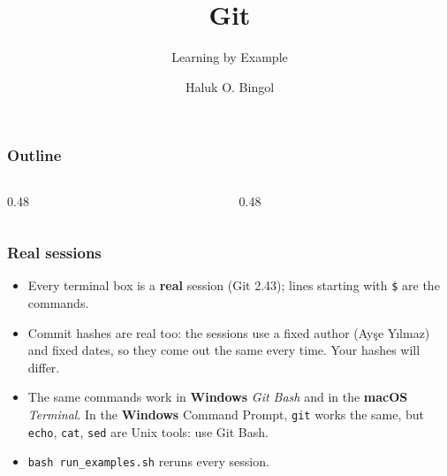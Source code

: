 \documentclass[aspectratio=169,10pt,compress]{beamer}
\title{Git}
\subtitle{Learning by Example}
\author[Bingol]{Haluk O. Bingol}
\institute[FCIS]{
    Faculty of Computer and Information Sciences\\
    Yeditepe University
}
\date{
	{\tiny \hbTimeStamp}
}
\newcommand{\win}{\textbf{Windows}}
\newcommand{\mac}{\textbf{macOS}}
\begin{document}
\begin{frame}[t,fragile]
  \titlepage
\end{frame}




\begin{frame}[t,fragile] \frametitle{Outline}
  \begin{columns}[T]
    \begin{column}{0.48\textwidth}
      \tableofcontents[sections={1-4}, hideallsubsections]
    \end{column}
    \begin{column}{0.48\textwidth}
      \tableofcontents[sections={5-8}, hideallsubsections]
    \end{column}
  \end{columns}
\end{frame}





\begin{frame}[t,fragile] \frametitle{Real sessions}
  \begin{itemize}
    \item Every terminal box is a \textbf{real} session (Git 2.43); lines starting with \texttt{\$} are the commands.
    \item Commit hashes are real too: the sessions use a fixed author (Ayşe Yılmaz) and fixed dates, so they come out the same every time.
          Your hashes will differ.
    \item The same commands work in \win{} \emph{Git Bash} and in the \mac{} \emph{Terminal}. In the \win{} Command Prompt, \texttt{git} works
          the same, but \texttt{echo}, \texttt{cat}, \texttt{sed} are Unix tools: use Git Bash.
    \item \texttt{bash run\_examples.sh} reruns every session.
  \end{itemize}
\end{frame}

\end{document}
